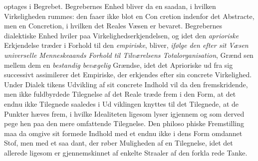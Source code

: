 optages i Begrebet. Begrebernes Enhed bliver da en saadan,
i hvilken Virkeligheden rummes: den faaer ikke blot en Con\-%
cretion indenfor det Abstracte, men en Concretion, i hvilken
det Reales Væsen er bevaret. Begrebernes dialektiske Enhed
hviler paa Virkelighedserkjendelsen, og idet den \emph{aprioriske}
Erkjendelse træder i Forhold til den \emph{empiriske}, bliver, \emph{ifølge
den efter sit Væsen universelle Menneskeaands
Forhold til Tilværelsens Totalorganisation}, Grænd\-%
sen mellem dem en \emph{bestandig bevægelig} Grændse, idet
det Aprioriske ud fra sig successivt assimilerer det Empiriske,
der erkjendes efter sin concrete Virkelighed. Under Dialek\-%
tikens Udvikling af sit concrete Indhold vil da den fremskridende,
men ikke fuldbyrdede Tilegnelse af det Reale træde
 frem i den Form, at det endnu ikke Tilegnede saaledes i Ud\-%
viklingen knyttes til det Tilegnede, at de Punkter hæves frem,
i hvilke Idealiteten ligesom lyser igjennem og som derved
pege hen paa den mere omfattende Tilegnelse. Den philoso\-%
phiske Fremstilling maa da omgive sit formede Indhold med
et endnu ikke i dens Form omdannet Stof, men med et saa\-%
dant, der røber Muligheden af en Tilegnelse, idet det allerede
ligesom er gjennemskinnet af enkelte Straaler af den forkla\-%
rede Tanke.

